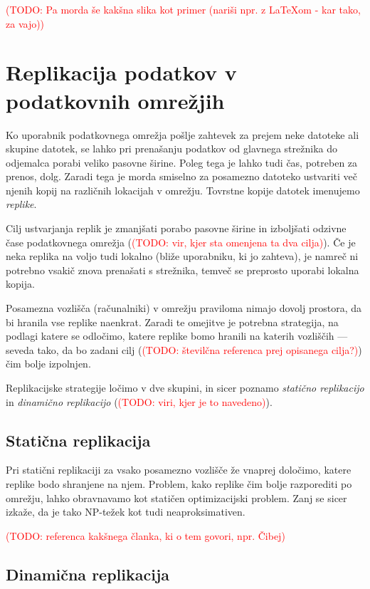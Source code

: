 \documentclass[a4paper, 12pt]{book}
\newcommand{\newterm}{\textit}
\newcommand{\TODO}[1]{\textcolor{red}{(TODO: #1)}}
\begin{document}
\TODO{Pa morda še kakšna slika kot primer (nariši npr. z LaTeXom - kar tako,
 za vajo)}

\section{Replikacija podatkov v podatkovnih omrežjih}

Ko uporabnik podatkovnega omrežja pošlje zahtevek za prejem neke datoteke
ali skupine datotek, se lahko pri prenašanju podatkov od glavnega strežnika
do odjemalca porabi veliko pasovne širine. Poleg tega je lahko tudi čas,
potreben za prenos, dolg. Zaradi tega je morda smiselno za posamezno
datoteko ustvariti več njenih kopij na različnih lokacijah v omrežju.
Tovrstne kopije datotek imenujemo \newterm{replike}.

Cilj ustvarjanja replik je zmanjšati porabo pasovne širine in izboljšati
odzivne čase podatkovnega omrežja (\TODO{vir, kjer sta omenjena ta dva
cilja}). Če je neka replika na voljo tudi lokalno (bliže
uporabniku, ki jo zahteva), je namreč ni potrebno vsakič znova prenašati s
strežnika, temveč se preprosto uporabi lokalna kopija.

Posamezna vozlišča (računalniki) v omrežju praviloma nimajo dovolj prostora,
da bi hranila vse replike naenkrat. Zaradi te omejitve je potrebna
strategija, na podlagi katere se odločimo, katere replike bomo hranili
na katerih vozliščih --- seveda tako, da bo zadani cilj (\TODO{številčna
referenca prej opisanega cilja?}) čim bolje izpolnjen.

Replikacijske strategije ločimo v dve skupini, in sicer poznamo
\newterm{statično replikacijo} in \newterm{dinamično replikacijo}
(\TODO{viri, kjer je to navedeno}).

\subsection{Statična replikacija}

Pri statični replikaciji za vsako posamezno vozlišče že vnaprej določimo,
katere replike bodo shranjene na njem. Problem, kako replike čim bolje
razporediti po omrežju, lahko obravnavamo kot statičen optimizacijski
problem. Zanj se sicer izkaže, da je tako NP-težek kot tudi
neaproksimativen.

\TODO{referenca kakšnega članka, ki o tem govori, npr. Čibej}

\subsection{Dinamična replikacija}
\end{document}
